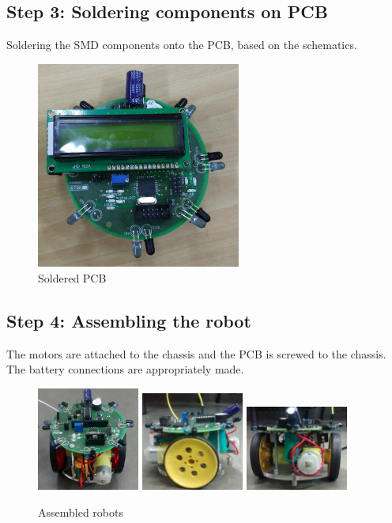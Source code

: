 \documentclass[a4paper,12pt,oneside]{book}
\begin{document}
\subsection*{Step 3: Soldering components on PCB}
Soldering the SMD components onto the PCB, based on the schematics.
\begin{figure}[h!]
	\centering\includegraphics[width=0.6\textwidth]{./Pictures/PCB_interfaced_with_LCD}
	\caption{Soldered PCB}		
\end{figure}
\subsection*{Step 4: Assembling the robot}
The motors are attached to the chassis and the PCB is screwed to the chassis. The battery connections are appropriately made.
\begin{figure}[h!]
	\includegraphics[width=0.30\textwidth]{./Pictures/version2_top}
	\includegraphics[width=0.30\textwidth]{./Pictures/version1_Side}
	\includegraphics[width=0.30\textwidth]{./Pictures/version1_Back}
	\caption{Assembled robots}		
\end{figure}	
\hfill\\
\end{document}
